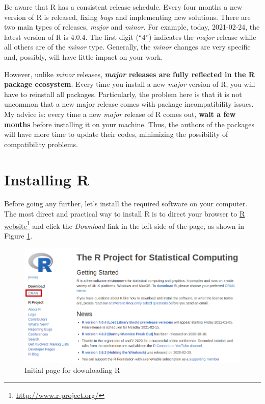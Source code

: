 \documentclass[
  12pt,
]{book}
\newenvironment{rmdimportant}
{\begin{importantblock}
		
	} {\end{importantblock}}
\begin{document}
\begin{rmdimportant}
Be aware that R has a consistent release schedule. Every four months a
new version of R is released, fixing \emph{bugs} and implementing new
solutions. There are two main types of releases, \emph{major} and
\emph{minor}. For example, today, 2021-02-24, the latest version of R is
4.0.4. The first digit (``4'') indicates the \emph{major} release while
all others are of the \emph{minor} type. Generally, the \emph{minor}
changes are very specific and, possibly, will have little impact on your
work.

However, unlike \emph{minor} releases, \textbf{\emph{major} releases are
fully reflected in the R package ecosystem}. Every time you install a
new \emph{major} version of R, you will have to reinstall all packages.
Particularly, the problem here is that it is not uncommon that a new
major release comes with package incompatibility issues. My advice is:
every time a new \emph{major} release of R comes out, \textbf{wait a few
months} before installing it on your machine. Thus, the authors of the
packages will have more time to update their codes, minimizing the
possibility of compatibility problems.
\end{rmdimportant}

\hypertarget{installing}{%
\section{Installing R}\label{installing}}

Before going any further, let's install the required software on your computer. The most direct and practical way to install R is to direct your browser to \href{http://www.r-project.org/}{R website}\footnote{\url{http://www.r-project.org/}} and click the \emph{Download} link in the left side of the page, as shown in Figure \ref{fig:website-cran-1}.

\begin{figure}[!htbp]

{\centering \includegraphics[width=1\linewidth]{figs/website_cran_1} 

}

\caption{Initial page for downloading R}\label{fig:website-cran-1}
\end{figure}
\end{document}
